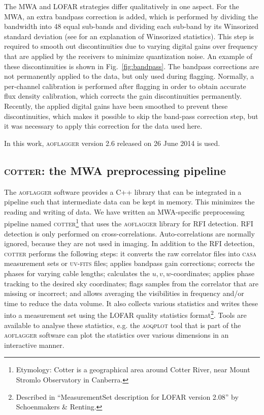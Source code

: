 \documentclass{pasa}
\begin{document}
The MWA and LOFAR strategies differ qualitatively in one aspect. For the MWA, an extra bandpass correction is added, which is performed by dividing the bandwidth into 48 equal sub-bands and dividing each sub-band by its Winsorized standard deviation (see \citet{variance-estimates} for an explanation of Winsorized statistics). This step is required to smooth out discontinuities due to varying digital gains over frequency that are applied by the receivers to minimize quantization noise. An example of these discontinuities is shown in Fig.~\ref{fig:bandpass}. The bandpass corrections are not permanently applied to the data, but only used during flagging. Normally, a per-channel calibration is performed after flagging in order to obtain accurate flux density calibration, which corrects the gain discontinuities permanently. Recently, the applied digital gains have been smoothed to prevent these discontinuities, which makes it possible to skip the band-pass correction step, but it was necessary to apply this correction for the data used here.

In this work, \textsc{aoflagger} version 2.6 released on 26 June 2014 is used.

\subsection{\textsc{cotter}: the MWA preprocessing pipeline}

The \textsc{aoflagger} software provides a C++ library that can be integrated in a pipeline such that intermediate data can be kept in memory. This minimizes the reading and writing of data. We have written an MWA-specific preprocessing pipeline named \textsc{cotter}\footnote{Etymology: Cotter is a geographical area around Cotter River, near Mount Stromlo Observatory in Canberra.} that uses the \textsc{aoflagger} library for RFI detection. RFI detection is only performed on cross-correlations. Auto-correlations are normally ignored, because they are not used in imaging. In addition to the RFI detection, \textsc{cotter} performs the following steps: it converts the raw correlator files into \textsc{casa} measurement sets or \textsc{uv-fits} files; applies bandpass gain corrections; corrects the phases for varying cable lengths; calculates the $u,v,w$-coordinates; applies phase tracking to the desired sky coordinates; flags samples from the correlator that are missing or incorrect; and allows averaging the visibilities in frequency and/or time to reduce the data volume. It also collects various statistics and writes these into a measurement set using the LOFAR quality statistics format\footnote{Described in ``MeasurementSet description for LOFAR version 2.08'' by Schoenmakers \& Renting.}. Tools are available to analyse these statistics, e.g. the \textsc{aoqplot} tool that is part of the \textsc{aoflagger} software can plot the statistics over various dimensions in an interactive manner.
\end{document}

